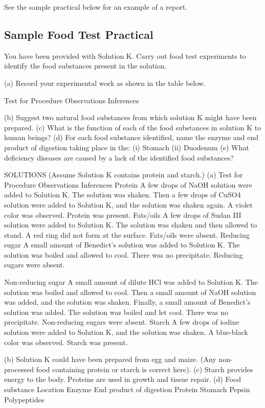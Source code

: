 \begin{enumerate}
See the sample practical below for an example of a report.

\subsection{Sample Food Test Practical}

You have been provided with Solution K. Carry out food test experiments to identify the food substances present in the solution.

(a) Record your experimental work as shown in the table below.

Test for
Procedure
Observations
Inferences

(b) Suggest two natural food substances from which solution K might have been prepared.
(c) What is the function of each of the food substances in solution K to human beings?
(d) For each food substance identified, name the enzyme and end product 
  of digestion taking place in the:
(i) Stomach
(ii) Duodenum
(e) What deficiency diseases are caused by a lack of the identified food substances?

SOLUTIONS
(Assume Solution K contains protein and starch.)
(a)
Test for
Procedure
Observations
Inferences
Protein
A few drops of NaOH solution were added to Solution K. The solution was shaken. Then a few drops of CuSO4 solution were added to Solution K, and the solution was shaken again. 
A violet color was observed.
Protein was present.
Fats/oils
A few drops of Sudan III solution were added to Solution K. The solution was shaken and then allowed to stand.
A red ring did not form at the surface.
Fats/oils were absent.
Reducing sugar
A small amount of Benedict’s solution was added to Solution K. The solution was boiled and allowed to cool.
There was no precipitate.
Reducing sugars were absent.

Non-reducing sugar
A small amount of dilute HCl was added to Solution K. The solution was boiled and allowed to cool. Then a small amount of NaOH solution was added, and the solution was shaken. Finally, a small amount of Benedict’s solution was added. The solution was boiled and let cool. 
There was no precipitate.
Non-reducing sugars were absent.
Starch
A few drops of iodine solution were added to Solution K, and the solution was shaken.
A blue-black color was observed.
Starch was present.

(b) Solution K could have been prepared from egg and maize. (Any non-processed food containing protein or starch is correct here).
(c) Starch provides energy to the body. Proteins are used in growth and tissue repair.
(d) 
Food substance
Location
Enzyme
End product of digestion
Protein
Stomach
Pepsin
Polypeptides


\end{enumerate}
